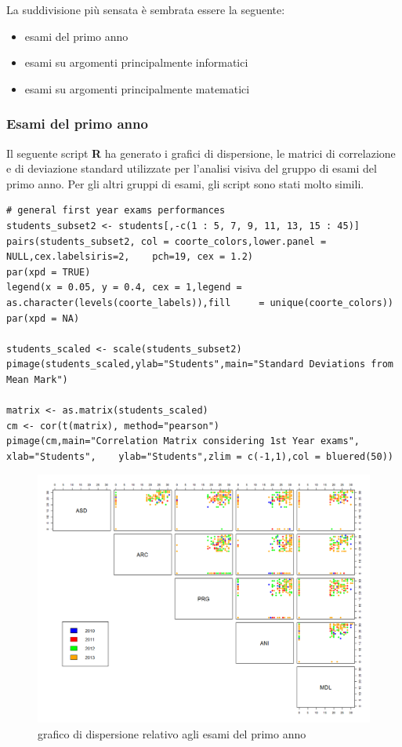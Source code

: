 La suddivisione più sensata è sembrata essere la seguente:

\begin{itemize}
    \item esami del primo anno
    \item esami su argomenti principalmente informatici
    \item esami su argomenti principalmente matematici
\end{itemize}

\subsubsection{Esami del primo anno}

Il seguente script \textbf{R} ha generato i grafici di dispersione, le matrici di correlazione e di deviazione standard utilizzate per l’analisi visiva del gruppo di esami del primo anno. Per gli altri gruppi di esami, gli script sono stati molto simili.

\begin{lstlisting}
# general first year exams performances
students_subset2 <- students[,-c(1 : 5, 7, 9, 11, 13, 15 : 45)]
pairs(students_subset2, col = coorte_colors,lower.panel = NULL,cex.labelsiris=2, 	pch=19, cex = 1.2)
par(xpd = TRUE)
legend(x = 0.05, y = 0.4, cex = 1,legend = as.character(levels(coorte_labels)),fill 	= unique(coorte_colors))
par(xpd = NA)

students_scaled <- scale(students_subset2)
pimage(students_scaled,ylab="Students",main="Standard Deviations from Mean Mark")

matrix <- as.matrix(students_scaled)
cm <- cor(t(matrix), method="pearson")
pimage(cm,main="Correlation Matrix considering 1st Year exams", xlab="Students", 	ylab="Students",zlim = c(-1,1),col = bluered(50))
\end{lstlisting}

\begin{figure}
    \centering
    \caption{grafico di dispersione relativo agli esami del primo anno}
    \label{esami1anno_sp}
	\includegraphics[scale=0.32]{img/scatter_plot_4_gen.png}
\end{figure}

